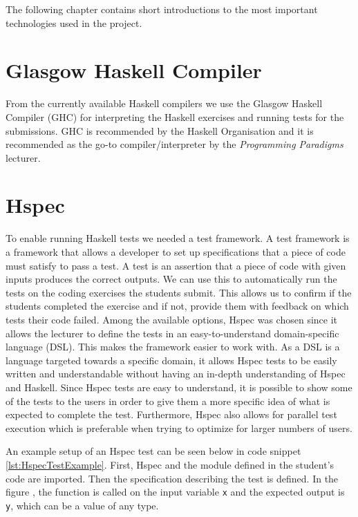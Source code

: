 The following chapter contains short introductions to the most important technologies used in the project.

\section*{Glasgow Haskell Compiler} 
From the currently available Haskell compilers we use the Glasgow Haskell Compiler (GHC) for interpreting the Haskell exercises and running tests for the submissions. GHC is recommended by the Haskell Organisation and it is recommended as the go-to compiler/interpreter by the \textit{Programming Paradigms} lecturer\cite{Haskell_GHC}.


\section*{Hspec}
To enable running Haskell tests we needed a test framework. A test framework is a framework that allows a developer to set up specifications that a piece of code must satisfy to pass a test. 
A test is an assertion that a piece of code with given inputs produces the correct outputs.  
We can use this  to automatically run the tests on the coding exercises the students submit. This allows us to confirm if the students completed the exercise and if not, provide them with feedback on which tests their code failed.
Among the available options, Hspec was chosen since it allows the lecturer to define the tests in an easy-to-understand domain-specific language (DSL).
This makes the framework easier to work with. As a DSL is a language targeted towards a specific domain, it allows Hspec tests to be easily written and understandable without having an in-depth understanding of Hspec and Haskell. 
Since Hspec tests are easy to understand, it is possible to show some of the tests to the users in order to give them a more specific idea of what is expected to complete the test.
Furthermore, Hspec also allows for parallel test execution which is preferable when trying to optimize for larger numbers of users\cite{Hspec_landing}.

An example setup of an Hspec test can be seen below in code snippet \ref{lst:HspecTestExample}. First, Hspec and the module defined in the student's code are imported. Then the specification describing the test  is defined. In the figure , the function is called on the input variable \texttt{x} and the expected output is \texttt{y}, which can be a value of any type.


